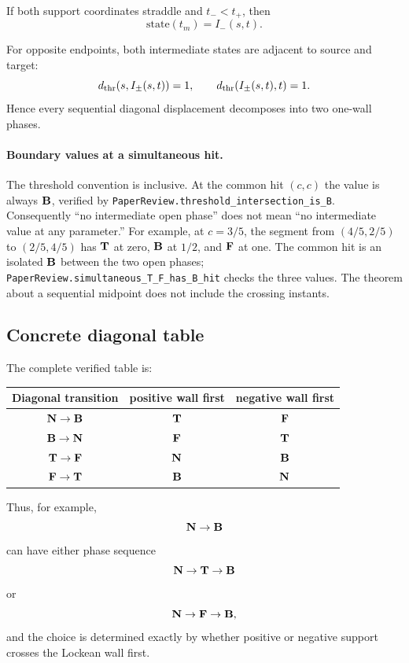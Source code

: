 \begin{theorem}
If both support coordinates straddle and \(t_-<t_+\), then
\[
  \text{state}(t_m)=I_-(s,t).
\]
\statusverified
\end{theorem}

For opposite endpoints, both intermediate states are adjacent to source and target:
\[
  d_{\mathrm{thr}}(s,I_\pm(s,t))=1,
  \qquad
  d_{\mathrm{thr}}(I_\pm(s,t),t)=1.
\]
Hence every sequential diagonal displacement decomposes into two one-wall phases.

\paragraph{Boundary values at a simultaneous hit.}
The threshold convention is inclusive. At the common hit \((c,c)\) the value is always \(\mathbf{B}\), verified by \texttt{PaperReview.threshold\_intersection\_is\_B}. Consequently ``no intermediate open phase'' does not mean ``no intermediate value at any parameter.'' For example, at \(c=3/5\), the segment from \((4/5,2/5)\) to \((2/5,4/5)\) has \(\mathbf{T}\) at zero, \(\mathbf{B}\) at \(1/2\), and \(\mathbf{F}\) at one. The common hit is an isolated \(\mathbf{B}\) between the two open phases; \texttt{PaperReview.simultaneous\_T\_F\_has\_B\_hit} checks the three values. The theorem about a sequential midpoint does not include the crossing instants.

\subsection{Concrete diagonal table}

The complete verified table is:

\begin{center}
\begin{tabular}{ccc}
\toprule
Diagonal transition & positive wall first & negative wall first\\
\midrule
\(\mathbf{N}\to\mathbf{B}\) & \(\mathbf{T}\) & \(\mathbf{F}\)\\
\(\mathbf{B}\to\mathbf{N}\) & \(\mathbf{F}\) & \(\mathbf{T}\)\\
\(\mathbf{T}\to\mathbf{F}\) & \(\mathbf{N}\) & \(\mathbf{B}\)\\
\(\mathbf{F}\to\mathbf{T}\) & \(\mathbf{B}\) & \(\mathbf{N}\)\\
\bottomrule
\end{tabular}
\end{center}

Thus, for example,
\[
  \mathbf{N}\to\mathbf{B}
\]
can have either phase sequence
\[
  \mathbf{N}\to\mathbf{T}\to\mathbf{B}
\]
or
\[
  \mathbf{N}\to\mathbf{F}\to\mathbf{B},
\]
and the choice is determined exactly by whether positive or negative support crosses the Lockean wall first.

